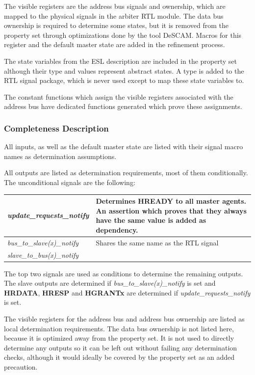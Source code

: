 The visible registers are the address bus signals and ownership, which are mapped to the physical signals in the arbiter RTL module. The data bus ownership is required to determine some states, but it is removed from the property set through optimizations done by the tool DeSCAM. Macros for this register and the default master state are added in the refinement process. \par
The state variables from the ESL description are included in the property set although their type and values represent abstract states. A type is added to the RTL signal package, which is never used except to map these state variables to. \par
The constant functions which assign the visible registers associated with the address bus have dedicated functions generated which prove these assignments. 


\subsubsection{Completeness Description}
All inputs, as well as the default master state are listed with their signal macro names as determination assumptions. \par
All outputs are listed as determination requirements, most of them conditionally. The unconditional signals are the following: \\

\begin{tabular}{p{4.3cm} | p{10cm}}
\textit{update\_requests\_notify} & Determines \textbf{HREADY} to all master agents. An assertion which proves that they always have the same value is added as dependency. \\
\hline
\textit{bus\_to\_slave(x)\_notify} & Shares the same name as the RTL signal \\
\textit{slave\_to\_bus(x)\_notify} &  \\
\end{tabular}

The top two signals are used as conditions to determine the remaining outputs. The slave outputs are determined if \textit{bus\_to\_slave(x)\_notify} is set and \textbf{HRDATA}, \textbf{HRESP} and \textbf{HGRANTx} are determined if \textit{update\_requests\_notify} is set. \par

The visible registers for the address bus and address bus ownership are listed as local determination requirements. The data bus ownership is not listed here, because it is optimized away from the property set. It is not used to directly determine any outputs so it can be left out without failing any determination checks, although it would ideally be covered by the property set as an added precaution. \par

